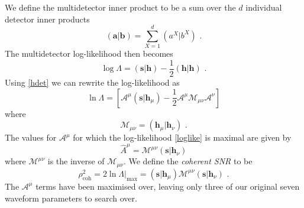 \documentclass[11pt]{cuthesis}
\newcommand{\fs}{\text{ .}}
\begin{document}
We define the multidetector inner product to be a sum over the $d$ individual detector inner products
\begin{equation}
(\textbf{a}|\textbf{b}) = \sum_{X=1}^d (a^X|b^X) \textbf{ .}
\end{equation}
The multidetector log-likelihood then becomes
\begin{equation}
\log \Lambda = (\textbf{s}|\textbf{h}) - \frac{1}{2}(\textbf{h}|\textbf{h}) \textbf{ .}
\end{equation}
Using \ref{hdet} we can rewrite the log-likelihood as 
\begin{equation} \label{loglike}
\ln \Lambda = \left[ \mathcal{A}^\mu(\textbf{s}|\textbf{h}_\mu) - \frac{1}{2}\mathcal{A}^\mu \mathcal{M}_{\mu\nu}\mathcal{A}^\nu \right]
\end{equation}
where
\begin{equation}
\mathcal{M}_{\mu\nu} = (\textbf{h}_\mu|\textbf{h}_\nu) \textbf{ .}
\end{equation}
The values for $\mathcal{A}^\mu$ for which the log-likelihood \ref{loglike} is maximal are given by
\begin{equation}
\hat{A}^\mu =\mathcal{M}^{\mu\nu}(\textbf{s}|\textbf{h}_\nu)
\end{equation}
where $\mathcal{M}^{\mu\nu}$ is the inverse of $\mathcal{M}_{\mu\nu}$. We define the \textit{coherent SNR} to be
\begin{equation} \label{rhocoh1}
\rho^2_\text{coh} = 2\ln \Lambda |_\text{max} = (\textbf{s}|\textbf{h}_\mu)\mathcal{M}^{\mu\nu}(\textbf{s}|\textbf{h}_\nu) \fs
\end{equation}
The  $\mathcal{A}^\mu$ terms have been maximised over, leaving only three of our original seven waveform parameters to search over. 
\end{document}

